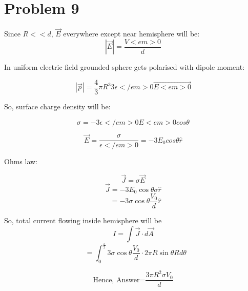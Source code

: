 \documentclass[11pt,a4paper]{scrartcl}
\begin{document}
\section{Problem 9}
\begin{solution}
Since $R<<d$, $\vec{E}$ everywhere except near hemisphere will be:
$$
\boxed{
    |\vec{E}|=\frac{V<em>0}{d}
}
$$

In uniform electric field grounded sphere gets polarised with dipole moment:



$$
\boxed{
    | \vec{p} |=\frac{4}{3} \pi R^3 3\epsilon</em>{0} \vec{E<em>0}
}
$$


So, surface charge density will be:




$$\boxed{
\sigma = -3\epsilon</em>{0} E<em>0 cos\theta
}
$$




$$\boxed{\vec{E} = \frac{\sigma}{\epsilon</em>{0}}=-3E_0 cos\theta \hat{r}} $$

Ohms law:

$$\vec{J}=\sigma \vec{E}$$
$$\vec{J} = -3E_0 \cos \theta \sigma \hat{r}$$
$$\ \ \ = -3\sigma \cos\theta\frac{V_0}{d} \hat{r}$$

So, total current flowing inside hemisphere will be 
$$ I= \int \vec{J} \cdot d \vec{A}$$
$$\ \ \ = \int_0^{\frac{\pi}{2}} 3\sigma \cos\theta\frac{V_0}{d} \cdot 2\pi R \sin \theta R d \theta$$

$$\boxed{\text{Hence, Answer=} \frac{3\pi R^2 \sigma V_0}{d}}$$
\end{solution}
\end{document}
